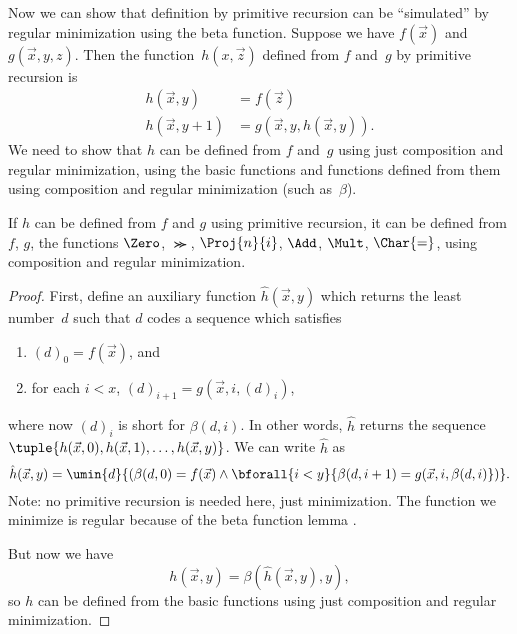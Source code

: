 \documentclass[../../../include/open-logic-section]{subfiles}
\begin{document}

Now we can show that definition by primitive recursion can be
``simulated'' by regular minimization using the beta function. Suppose
we have $f(\vec x)$ and $g(\vec x, y, z)$. Then the function~$h(x,\vec
z)$ defined from $f$ and~$g$ by primitive recursion is
\begin{align*}
h(\vec x, y) & =  f(\vec z) \\
h(\vec x, y+1) & =  g(\vec x, y, h(\vec x, y)).
\end{align*}
We need to show that $h$ can be defined from $f$ and~$g$ using just
composition and regular minimization, using the basic functions and
functions defined from them using composition and regular minimization
(such as~$\beta$).

\begin{lem}
If $h$ can be defined from $f$ and $g$ using primitive recursion, it
can be defined from $f$, $g$, the functions $\Zero$, $\Succ$,
$\Proj{n}{i}$, $\Add$, $\Mult$, $\Char{=}$, using composition and
regular minimization.
\end{lem}

\begin{proof}
First, define an auxiliary function $\hat h(\vec x, y)$ which returns
the least number~$d$ such that $d$ codes a sequence which satisfies
\begin{enumerate}
\item $(d)_0 = f(\vec x)$, and
\item for each $i < x$, $(d)_{i+1} = g(\vec x, i, (d)_i)$,
\end{enumerate}
where now $(d)_i$ is short for $\beta(d,i)$. In other words, $\hat h$
returns the sequence $\tuple{h(\vec x, 0), h(\vec x, 1), \dots, h(\vec
x, y)}$. We can write $\hat h$ as
\[
\hat h(\vec x, y) = \umin{d}{(\beta(d,0) = f(\vec x) \land \bforall{i <
  y}{\beta(d,i+1) = g(\vec x, i,\beta(d,i)})}.
\]
Note: no primitive recursion is needed here, just minimization. The
function we minimize is regular because of the beta function lemma
.

But now we have
\[
h(\vec x, y) = \beta(\hat h(\vec x, y), y),
\]
so $h$ can be defined from the basic functions using just composition
and regular minimization.
\end{proof}
\end{document}
